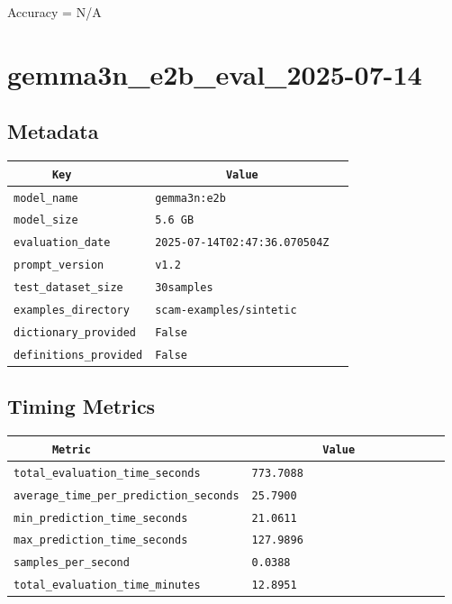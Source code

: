 \documentclass{article}
\begin{document}
\begin{center}
Accuracy = N/A
\end{center}

\section{gemma3n\_e2b\_eval\_2025-07-14}
\subsection{Metadata}

\begin{center}
\begin{tabular}{l | l} \hline
    \verb|      Key      | & \verb|           Value           | \\ \hline
    \hline
    \verb|model_name    | & \verb|gemma3n:e2b                  | \\ \hline
    \verb|model_size    | & \verb|5.6 GB                       | \\ \hline
    \verb|evaluation_date| & \verb|2025-07-14T02:47:36.070504Z  | \\ \hline
    \verb|prompt_version| & \verb|v1.2                         | \\ \hline
    \verb|test_dataset_size| & \verb|30samples                    | \\ \hline
    \verb|examples_directory| & \verb|scam-examples/sintetic       | \\ \hline
    \verb|dictionary_provided| & \verb|False                        | \\ \hline
    \verb|definitions_provided| & \verb|False                        | \\ \hline
\end{tabular}
\end{center}

\subsection{Timing Metrics}

\begin{center}
\begin{tabular}{l | l} \hline
    \verb|      Metric     | & \verb|           Value           | \\ \hline
    \hline
    \verb|total_evaluation_time_seconds| & \verb|773.7088                     | \\ \hline
    \verb|average_time_per_prediction_seconds| & \verb|25.7900                      | \\ \hline
    \verb|min_prediction_time_seconds| & \verb|21.0611                      | \\ \hline
    \verb|max_prediction_time_seconds| & \verb|127.9896                     | \\ \hline
    \verb|samples_per_second| & \verb|0.0388                       | \\ \hline
    \verb|total_evaluation_time_minutes| & \verb|12.8951                      | \\ \hline
\end{tabular}
\end{center}
\end{document}
